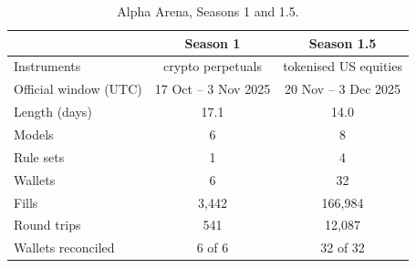 \begin{table}[ht]
\centering
\small
\caption{Alpha Arena, Seasons 1 and 1.5.}
\label{tab:data}
\begin{tabular}{lcc}
\toprule
 & Season 1 & Season 1.5 \\
\midrule
Instruments & crypto perpetuals & tokenised US equities \\
Official window (UTC) & 17 Oct -- 3 Nov 2025 & 20 Nov -- 3 Dec 2025 \\
Length (days) & 17.1 & 14.0 \\
Models & 6 & 8 \\
Rule sets & 1 & 4 \\
Wallets & 6 & 32 \\
Fills & 3{,}442 & 166{,}984 \\
Round trips & 541 & 12{,}087 \\
Wallets reconciled & 6 of 6 & 32 of 32 \\
\bottomrule
\end{tabular}
\end{table}
